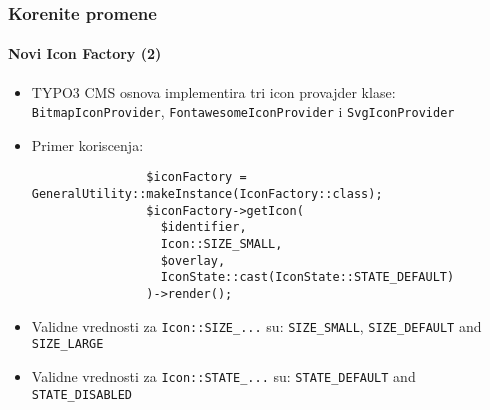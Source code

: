 \begin{frame}[fragile]
	\frametitle{Korenite promene}
	\framesubtitle{Novi Icon Factory (2)}

	\lstset{basicstyle=\tiny\ttfamily}

	\begin{itemize}

		\item TYPO3 CMS osnova implementira tri icon provajder klase:\newline
			\smaller
				\texttt{BitmapIconProvider}, \texttt{FontawesomeIconProvider} i \texttt{SvgIconProvider}
			\normalsize

		\item Primer koriscenja:

			\begin{lstlisting}
				$iconFactory = GeneralUtility::makeInstance(IconFactory::class);
				$iconFactory->getIcon(
				  $identifier,
				  Icon::SIZE_SMALL,
				  $overlay,
				  IconState::cast(IconState::STATE_DEFAULT)
				)->render();
			\end{lstlisting}

		\item Validne vrednosti za \texttt{Icon::SIZE\_...} su:\newline
			\small\texttt{SIZE\_SMALL}, \texttt{SIZE\_DEFAULT} and \texttt{SIZE\_LARGE}\normalsize
			\vspace{0.4cm}

		\item Validne vrednosti za \texttt{Icon::STATE\_...} su:\newline
			\small\texttt{STATE\_DEFAULT} and \texttt{STATE\_DISABLED}\normalsize

	\end{itemize}

\end{frame}


